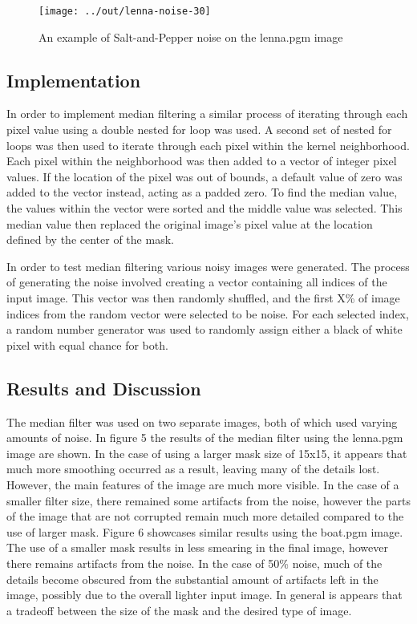 \documentclass[headings=optiontoheadandtoc,listof=totoc,parskip=full]{scrartcl}
\begin{document}
\begin{figure}[ht]
	\centering
	\texttt{[image: ../out/lenna-noise-30]}
	\caption{An example of Salt-and-Pepper noise on the lenna.pgm image}
	\label{fig:noise-example-1}
\end{figure}

\subsection{Implementation}
\label{sec:median-implementation}

In order to implement median filtering a similar process of iterating through each pixel value using a double nested for loop was used. A second set of nested for loops was then used to iterate through each pixel within the kernel neighborhood. Each pixel within the neighborhood was then added to a vector of integer pixel values. If the location of the pixel was out of bounds, a default value of zero was added to the vector instead, acting as a padded zero. To find the median value, the values within the vector were sorted and the middle value was selected. This median value then replaced the original image’s pixel value at the location defined by the center of the mask. 

In order to test median filtering various noisy images were generated. The process of generating the noise involved creating a vector containing all indices of the input image. This vector was then randomly shuffled, and the first X\% of image indices from the random vector were selected to be noise. For each selected index, a random number generator was used to randomly assign either a black of white pixel with equal chance for both.



\subsection{Results and Discussion}
\label{sec:median-results}

The median filter was used on two separate images, both of which used varying amounts of noise. In figure 5 the results of the median filter using the lenna.pgm image are shown. In the case of using a larger mask size of 15x15, it appears that much more smoothing occurred as a result, leaving many of the details lost. However, the main features of the image are much more visible. In the case of a smaller filter size, there remained some artifacts from the noise, however the parts of the image that are not corrupted remain much more detailed compared to the use of larger mask.
Figure 6 showcases similar results using the boat.pgm image. The use of a smaller mask results in less smearing in the final image, however there remains artifacts from the noise. In the case of 50\% noise, much of the details become obscured from the substantial amount of artifacts left in the image, possibly due to the overall lighter input image. In general is appears that a tradeoff between the size of the mask and the desired type of image.
\end{document}
